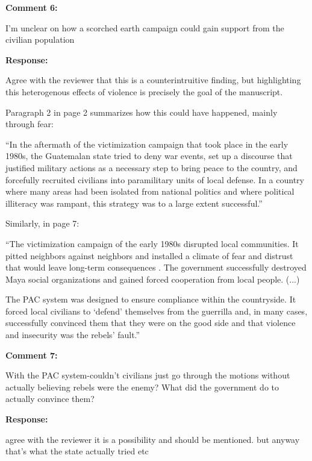 \documentclass[12pt, a4paper, notitlepage]{article}
\begin{document}
\vspace{15pt}
\noindent\textbf{Comment 6:}
\begin{displayquote}
I'm unclear on how a scorched earth campaign could gain support from the civilian population
\end{displayquote}

\noindent\textbf{Response:} {}

Agree with the reviewer that this is a counterintruitive finding, but highlighting this heterogenous effects of violence is precisely the goal of the manuscript.

Paragraph 2 in page 2 summarizes how this could have happened, mainly through fear:

``In the aftermath of the victimization campaign that took place in the early 1980s, the Guatemalan state tried to deny war events, set up a discourse that justified military actions as a necessary step to bring peace to the country, and forcefully recruited civilians into paramilitary units of local defense.
In a country where many areas had been isolated from national politics and where political illiteracy was rampant, this strategy was to a large extent successful.''

Similarly, in page 7:

``The victimization campaign of the early 1980s disrupted local communities. It pitted neighbors against neighbors and installed a climate of fear and distrust that would leave long-term consequences \citep{Burrell:2013aa}.
The government successfully destroyed Maya social organizations and gained forced cooperation from local people. (...)

The PAC system was designed to ensure compliance within the countryside.
It forced local civilians to `defend' themselves from the guerrilla and, in many cases, successfully convinced them that they were on the good side and that violence and insecurity was the rebels' fault.''

\vspace{15pt}
\noindent\textbf{Comment 7:}
\begin{displayquote}
With the PAC system-couldn't civilians just go through the motions without actually believing rebels were the enemy? What did the government do to actually convince them?
\end{displayquote}

\noindent\textbf{Response:} {}

agree with the reviewer it is a possibility and should be mentioned. but anyway that's what the state actually tried etc
\end{document}
